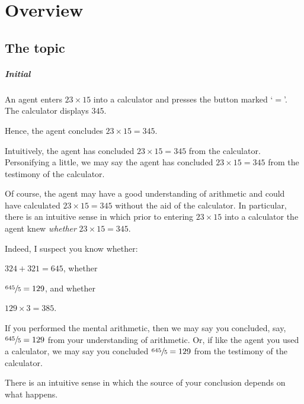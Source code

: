 \chapter{Overview}
\label{cha:overview}

\section{The topic}
\label{sec:issue}

\paragraph*{Initial }

\begin{note}
  \begin{scenario}[Multiplication]
    \label{illu:gist:calc}
    An agent enters \(23 \times 15\) into a calculator and presses the button marked `\(=\)'.
    The calculator displays \(345\).

    Hence, the agent concludes \(23 \times 15 = 345\).
  \end{scenario}

  Intuitively, the agent has concluded \(23 \times 15 = 345\) from the calculator.
  Personifying a little, we may say the agent has concluded \(23 \times 15 = 345\) from the testimony of the calculator.

  Of course, the agent may have a good understanding of arithmetic and could have calculated \(23 \times 15 = 345\) without the aid of the calculator.
  In particular, there is an intuitive sense in which prior to entering \(23 \times 15\) into a calculator the agent knew \emph{whether} \(23 \times 15 = 345\).

  Indeed, I suspect you know whether:
  \begin{enumerate*}[label=]
  \item
    \(324 + 321 = 645\), whether
  \item
    \(\sfrac{645}{5} = 129\), and whether
  \item
    \(129 \times 3 = 385\).
  \end{enumerate*}
  If you performed the mental arithmetic, then we may say you concluded, say, \(\sfrac{645}{5} = 129\) from your understanding of arithmetic.
  Or, if like the agent you used a calculator, we may say you concluded \(\sfrac{645}{5} = 129\) from the testimony of the calculator.

  There is an intuitive sense in which the source of your conclusion depends on what happens.


\end{note}
